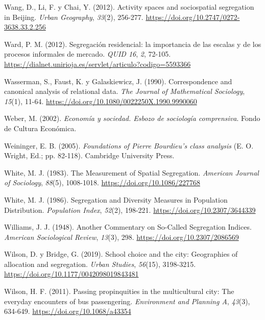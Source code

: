 \documentclass[
  spanish,
  a4paper,%
  chapterprefix=true,%
  DIV=calc,%
  twoside]{scrbook}%
\newlength{\cslhangindent}
\newenvironment{CSLReferences}[2] %
 {\begin{list}{}{%
  \setlength{\itemindent}{0pt}
  \setlength{\leftmargin}{0pt}
  \setlength{\parsep}{0pt}
  \ifodd #1
   \setlength{\leftmargin}{\cslhangindent}
   \setlength{\itemindent}{-1\cslhangindent}
  \fi
  \setlength{\itemsep}{#2\baselineskip}}}
 {\end{list}}
\begin{document}
\begin{CSLReferences}{1}{0}
Wang, D., Li, F. y Chai, Y. (2012). Activity spaces and sociospatial segregation in Beijing. \emph{Urban Geography}, \emph{33}(2), 256-277. \url{https://doi.org/10.2747/0272-3638.33.2.256}

Ward, P. M. (2012). Segregación residencial: la importancia de las escalas y de los procesos informales de mercado. \emph{QUID 16}, \emph{2}, 72-105. \url{https://dialnet.unirioja.es/servlet/articulo?codigo=5593366}

Wasserman, S., Faust, K. y Galaskiewicz, J. (1990). Correspondence and canonical analysis of relational data. \emph{The Journal of Mathematical Sociology}, \emph{15}(1), 11-64. \url{https://doi.org/10.1080/0022250X.1990.9990060}

Weber, M. (2002). \emph{Economía y sociedad. Esbozo de sociología comprensiva}. Fondo de Cultura Económica.

Weininger, E. B. (2005). \emph{Foundations of Pierre Bourdieu{'}s class analysis} (E. O. Wright, Ed.; pp. 82-118). Cambridge University Press.

White, M. J. (1983). The Measurement of Spatial Segregation. \emph{American Journal of Sociology}, \emph{88}(5), 1008-1018. \url{https://doi.org/10.1086/227768}

White, M. J. (1986). Segregation and Diversity Measures in Population Distribution. \emph{Population Index}, \emph{52}(2), 198-221. \url{https://doi.org/10.2307/3644339}

Williams, J. J. (1948). Another Commentary on So-Called Segregation Indices. \emph{American Sociological Review}, \emph{13}(3), 298. \url{https://doi.org/10.2307/2086569}

Wilson, D. y Bridge, G. (2019). School choice and the city: Geographies of allocation and segregation. \emph{Urban Studies}, \emph{56}(15), 3198-3215. \url{https://doi.org/10.1177/0042098019843481}

Wilson, H. F. (2011). Passing propinquities in the multicultural city: The everyday encounters of bus passengering. \emph{Environment and Planning A}, \emph{43}(3), 634-649. \url{https://doi.org/10.1068/a43354}


\end{CSLReferences}
\end{document}
